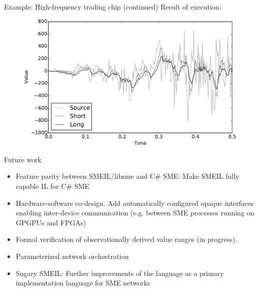 \documentclass{beamer}
\begin{document}
\begin{frame}{Example: High-frequency trading chip (continued)}
  Result of execution:
  \begin{figure}
  \includegraphics[width=\textwidth]{ewma_plot.pdf}
\end{figure}
\end{frame}

\begin{frame}{Future work}
  \begin{itemize}
    \item Feature parity between SMEIL/libsme and C\# SME: Make SMEIL fully
      capable IL for C\# SME
    \item Hardware-software co-design. Add automatically configured opaque
      interfaces enabling inter-device communication (e.g. between SME processes
      running on GPGPUs and FPGAs)
    \item Formal verification of observationally derived value ranges (in
      progress).
    \item Parameterized network orchestration
    \item Sugary SMEIL: Further improvements of the language as a primary
      implementation language for SME networks
  \end{itemize}
\end{frame}
\end{document}
